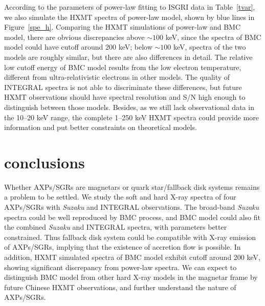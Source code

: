 \documentclass[]{raa}
\begin{document}
According to the parameters of power-law fitting to ISGRI data in Table~\ref{tvar}, we also simulate the HXMT spectra of power-law model, shown by blue lines in Figure~\ref{spe_h}.
%
Comparing the HXMT simulations of power-law and BMC model, there are obvious discrepancies above $\sim 100$ keV, since the spectra of BMC model could have cutoff around 200 keV; below $\sim 100$ keV, spectra of the two models are roughly similar, but there are also differences in detail.
%
The relative low cutoff energy of BMC model results from the low electron temperature, different from ultra-relativistic electrons in other models.
%
The quality of INTEGRAL spectra is not able to discriminate these differences, but future HXMT observations should have spectral resolution and S/N high enough to distinguish between those models.
%
Besides, as we still lack observational data in the 10--20 keV range, the complete 1--250 keV HXMT spectra could provide more information and put better constraints on theoretical models.



\section{conclusions}



Whether AXPs/SGRs are magnetars or quark star/fallback disk systems remains a problem to be settled.
%
We study the soft and hard X-ray spectra of four AXPs/SGRs with {\it Suzaku} and INTEGRAL observations.%
%
The broad-band {\it Suzaku} spectra could be well reproduced by BMC process, 
%
%
and BMC model could also fit the combined {\it Suzaku} and INTEGRAL spectra, with parameters better constrained.
%
Thus fallback disk system could be compatible with X-ray emission of AXPs/SGRs, implying that the existence of accretion flow is possible.
%
In addition, HXMT simulated spectra of BMC model exhibit cutoff around 200 keV, showing significant discrepancy from power-law spectra. 
%
%
We can expect to distinguish BMC model from other hard X-ray models in the magnetar frame by future Chinese HXMT observations, and further understand the nature of AXPs/SGRs.
\end{document}
